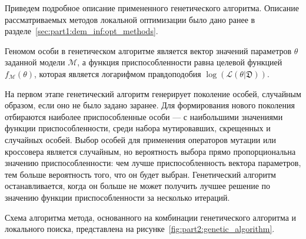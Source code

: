 Приведем подробное описание примененного генетического алгоритма.
Описание рассматриваемых методов локальной оптимизации было дано ранее в разделе~\ref{sec:part1:dem_inf:opt_methods}.

Геномом особи в генетическом алгоритме является вектор значений параметров $\theta$ заданной модели $\mathcal{M}$, а функция приспособленности равна целевой функцией $f_\mathcal{M}(\theta)$, которая является логарифмом правдоподобия $\log (\mathcal {L} (\theta | \mathfrak{D}))$.

На первом этапе генетический алгоритм генерирует поколение особей, случайным образом, если оно не было задано заранее.
Для формирования нового поколения отбираются наиболее приспособленные особи --- с наибольшими значениями функции приспособленности, среди набора мутировавших, скрещенных и случайных особей.
Выбор особей для применения операторов мутации или кроссовера является случайным, но вероятность выбора прямо пропорциональна значению приспособленности: чем лучше приспособленность вектора параметров, тем больше вероятность того, что он будет выбран.
Генетический алгоритм останавливается, когда он больше не может получить лучшее решение по значению функции приспособленности за несколько итераций.

Схема алгоритма метода, основанного на комбинации генетического алгоритма и локального поиска, представлена на рисунке~\ref{fig:part2:genetic_algorithm}.

